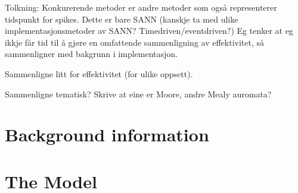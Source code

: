 \documentclass[a4paper,11 pt]{report}
\begin{document}
Tolkning:
Konkurerende metoder er andre metoder som også representerer tidspunkt for spikes. Dette er bare SANN (kanskje ta med ulike implementasjonsmetoder av SANN? Timedriven/eventdriven?)
Eg tenker at eg ikkje får tid til å gjøre en omfattende sammenligning av effektivitet, så sammenligner med bakgrunn i implementasjon. 

Sammenligne litt for effektivitet (for ulike oppsett).

Sammenligne tematisk? Skrive at eine er Moore, andre Mealy auromata?


\tableofcontents








\chapter{Background information} 	%





\chapter{The Model} 				%

\end{document}

